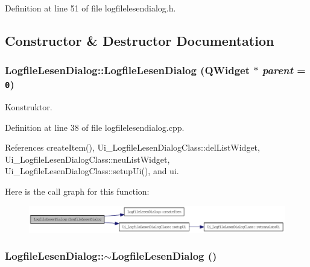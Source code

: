Definition at line 51 of file logfilelesendialog.h.

\subsection{Constructor \& Destructor Documentation}
\hypertarget{class_logfile_lesen_dialog_dcec514ae2ecb97a1a753a0e12335229}{
\subsubsection[LogfileLesenDialog]{\setlength{\rightskip}{0pt plus 5cm}LogfileLesenDialog::LogfileLesenDialog (QWidget $\ast$ {\em parent} = {\tt 0})}}
\label{class_logfile_lesen_dialog_dcec514ae2ecb97a1a753a0e12335229}


Konstruktor. 



Definition at line 38 of file logfilelesendialog.cpp.

References createItem(), Ui\_\-LogfileLesenDialogClass::delListWidget, Ui\_\-LogfileLesenDialogClass::neuListWidget, Ui\_\-LogfileLesenDialogClass::setupUi(), and ui.

Here is the call graph for this function:\nopagebreak
\begin{figure}[H]
\begin{center}
\leavevmode
\includegraphics[width=337pt]{class_logfile_lesen_dialog_dcec514ae2ecb97a1a753a0e12335229_cgraph}
\end{center}
\end{figure}
\hypertarget{class_logfile_lesen_dialog_6688d3b86807c1f62ae679ae1870a6b2}{
\subsubsection[$\sim$LogfileLesenDialog]{\setlength{\rightskip}{0pt plus 5cm}LogfileLesenDialog::$\sim$LogfileLesenDialog ()}}
\label{class_logfile_lesen_dialog_6688d3b86807c1f62ae679ae1870a6b2}


